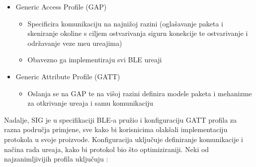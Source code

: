 \begin{itemize}
	\item Generic Access Profile (GAP)
	\begin{itemize}
		\item Specificira komunikaciju na najni\v{z}oj razini (ogla\v{s}avanje paketa i skeniranje okoline s ciljem ostvarivanja sigurn konekcije te ostvarivanje i odr\v{z}avanje veze me\dj u ure\dj ajima)
		\item Obavezno ga implementiraju svi BLE ure\dj aji
	\end{itemize}
	\item Generic Attribute Profile (GATT)
	\begin{itemize}
		\item Oslanja se na GAP te na vi\v{s}oj razini definira modele paketa i mehanizme za otkrivanje ure\dj aja i samu komunikaciju
	\end{itemize}
\end{itemize}

Nadalje, SIG je u specifikaciji BLE-a pru\v{z}io i konfiguraciju GATT profila za razna podru\v{c}ja primjene, sve kako bi korisnicima olak\v{s}ali implementaciju protokola u svoje proizvode. Konfiguracija uklju\v{c}uje definiranje komunikacije i na\v{c}ina rada ure\dj aja, kako bi protokol bio \v{s}to optimiziraniji. Neki od najzanimljivijih profila uklju\v{c}uju \cite{ble_profiles}: 


